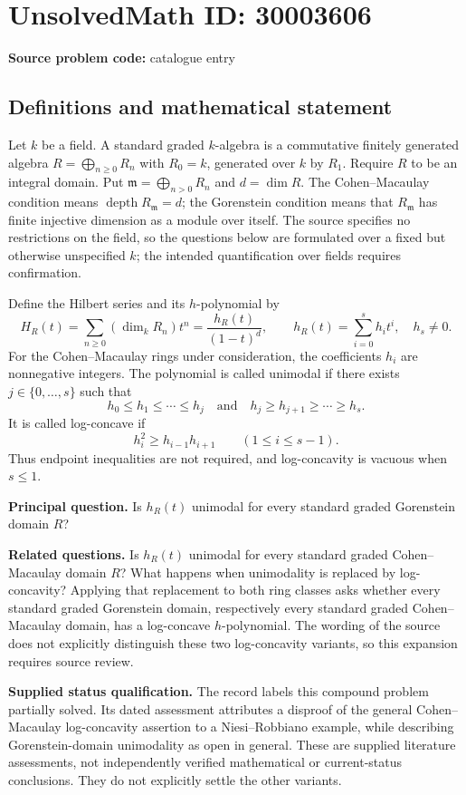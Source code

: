 \documentclass[11pt]{article}
\begin{document}
\section*{UnsolvedMath ID: 30003606}
\textbf{Source problem code:} catalogue entry
\subsection{Definitions and mathematical statement}
Let \(k\) be a field. A standard graded \(k\)-algebra is a commutative finitely generated algebra \(R=\bigoplus_{n\geq 0}R_n\) with \(R_0=k\), generated over \(k\) by \(R_1\). Require \(R\) to be an integral domain. Put \(\mathfrak m=\bigoplus_{n>0}R_n\) and \(d=\dim R\). The Cohen--Macaulay condition means \(\operatorname{depth}R_{\mathfrak m}=d\); the Gorenstein condition means that \(R_{\mathfrak m}\) has finite injective dimension as a module over itself. The source specifies no restrictions on the field, so the questions below are formulated over a fixed but otherwise unspecified \(k\); the intended quantification over fields requires confirmation.

Define the Hilbert series and its \(h\)-polynomial by
\[
H_R(t)=\sum_{n\geq0}(\dim_k R_n)t^n
       =\frac{h_R(t)}{(1-t)^d},
\qquad
h_R(t)=\sum_{i=0}^{s}h_i t^i,\quad h_s\ne0.
\]
For the Cohen--Macaulay rings under consideration, the coefficients \(h_i\) are nonnegative integers. The polynomial is called unimodal if there exists \(j\in\{0,\ldots,s\}\) such that
\[
h_0\leq h_1\leq\cdots\leq h_j
\quad\text{and}\quad
h_j\geq h_{j+1}\geq\cdots\geq h_s.
\]
It is called log-concave if
\[
h_i^2\geq h_{i-1}h_{i+1}
\qquad(1\leq i\leq s-1).
\]
Thus endpoint inequalities are not required, and log-concavity is vacuous when \(s\leq1\).

\textbf{Principal question.} Is \(h_R(t)\) unimodal for every standard graded Gorenstein domain \(R\)?

\textbf{Related questions.} Is \(h_R(t)\) unimodal for every standard graded Cohen--Macaulay domain \(R\)? What happens when unimodality is replaced by log-concavity? Applying that replacement to both ring classes asks whether every standard graded Gorenstein domain, respectively every standard graded Cohen--Macaulay domain, has a log-concave \(h\)-polynomial. The wording of the source does not explicitly distinguish these two log-concavity variants, so this expansion requires source review.

\textbf{Supplied status qualification.} The record labels this compound problem partially solved. Its dated assessment attributes a disproof of the general Cohen--Macaulay log-concavity assertion to a Niesi--Robbiano example, while describing Gorenstein-domain unimodality as open in general. These are supplied literature assessments, not independently verified mathematical or current-status conclusions. They do not explicitly settle the other variants.
\end{document}
